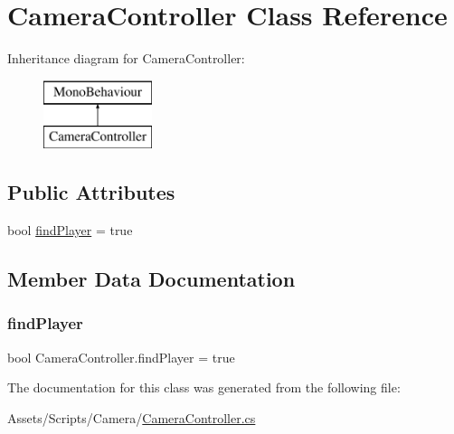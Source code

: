 \hypertarget{class_camera_controller}{}\section{Camera\+Controller Class Reference}
\label{class_camera_controller}
Inheritance diagram for Camera\+Controller\+:\begin{figure}[H]
\begin{center}
\leavevmode
\includegraphics[height=2.000000cm]{class_camera_controller}
\end{center}
\end{figure}
\subsection*{Public Attributes}
\begin{DoxyCompactItemize}
\item 
bool \mbox{\hyperlink{class_camera_controller_a2ce0aa2f36420905ad36a7c4cdb65347}{find\+Player}} = true
\end{DoxyCompactItemize}


\subsection{Member Data Documentation}
\mbox{\label{class_camera_controller_a2ce0aa2f36420905ad36a7c4cdb65347}} 
\subsubsection{\texorpdfstring{find\+Player}{findPlayer}}
{\footnotesize\ttfamily bool Camera\+Controller.\+find\+Player = true}



The documentation for this class was generated from the following file\+:\begin{DoxyCompactItemize}
\item 
Assets/\+Scripts/\+Camera/\mbox{\hyperlink{_camera_controller_8cs}{Camera\+Controller.\+cs}}\end{DoxyCompactItemize}
